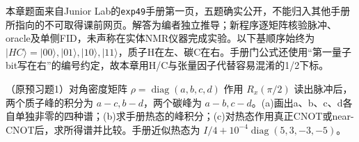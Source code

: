 本章题面来自Junior Lab的\texttt{exp49}手册第一页，五题确实公开，不能归入其他手册所指向的不可取得课前网页。解答为编者独立推导；新程序逐矩阵核验脉冲、oracle及单侧FID，未声称在实体NMR仪器完成实验。以下基顺序始终为 $|HC\rangle=|00\rangle,|01\rangle,|10\rangle,|11\rangle$，质子H在左、碳C在右。手册门公式还使用“第一量子bit写在右”的编号约定，故本章用H/C与张量因子代替容易混淆的1/2下标。

\begin{exercise}
（原预习题1）对角密度矩阵 $\rho=\operatorname{diag}(a,b,c,d)$ 作用 $R_x(\pi/2)$ 读出脉冲后，两个质子峰的积分为 $a-c,b-d$，两个碳峰为 $a-b,c-d$。(a)画出a、b、c、d各自单独非零的四种谱；(b)求手册热态的峰积分；(c)对热态作用真正CNOT或near-CNOT后，求所得谱并比较。手册近似热态为 $I/4+10^{-4}\operatorname{diag}(5,3,-3,-5)$。
\end{exercise}
